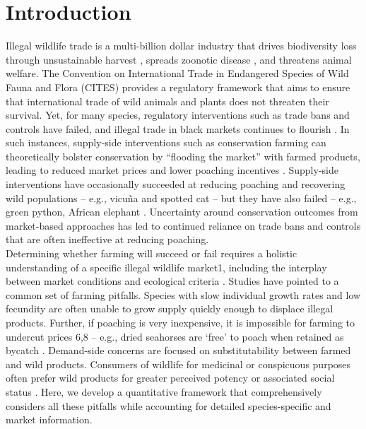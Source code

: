 \newpage

\section{Introduction}
\onehalfspacing
Illegal wildlife trade is a multi-billion dollar industry that drives biodiversity loss through unsustainable harvest \citep{t_sas-rolfes_illegal_2019}, spreads zoonotic disease \citep{bell_animal_2004}, and threatens animal welfare\citep{baker_rough_2013}. The Convention on International Trade in Endangered Species of Wild Fauna and Flora (CITES) provides a regulatory framework that aims to ensure that international trade of wild animals and plants does not threaten their survival. Yet, for many species, regulatory interventions such as trade bans and controls have failed, and illegal trade in black markets continues to flourish \citep{challender_poaching_2014, challender_towards_2015}. In such instances, supply-side interventions such as conservation farming can theoretically bolster conservation by “flooding the market” with farmed products, leading to reduced market prices and lower poaching incentives \citep{gentry_looking_2019, phelps_framework_2014, tensen_under_2016}. Supply-side interventions have occasionally succeeded at reducing poaching and recovering wild populations – e.g., vicuña and spotted cat \citep{iucn_world_2000, sahley_biological_2007} – but they have also failed – e.g., green python, African elephant \citep{lyons_wildlife_2011, hsiang_does_2016}. Uncertainty around conservation outcomes from market-based approaches has led to continued reliance on trade bans and controls that are often ineffective at reducing poaching.
\\
Determining whether farming will succeed or fail requires a holistic understanding of a specific illegal wildlife market1, including the interplay between market conditions and ecological criteria \citep{challender_understanding_2015}. Studies have pointed to a common set of farming pitfalls. Species with slow individual growth rates and low fecundity are often unable to grow supply quickly enough to displace illegal products. Further, if poaching is very inexpensive, it is impossible for farming to undercut prices 6,8 – e.g., dried seahorses are ‘free’ to poach when retained as bycatch \citep{lawson_low_2017}. Demand-side concerns are focused on substitutability between farmed and wild products. Consumers of wildlife for medicinal or conspicuous purposes often prefer wild products for greater perceived potency or associated social status \citep{dutton_stated_2011, gratwicke_attitudes_2008, fabinyi_historical_2012}. Here, we develop a quantitative framework that comprehensively considers all these pitfalls while accounting for detailed species-specific and market information. 
